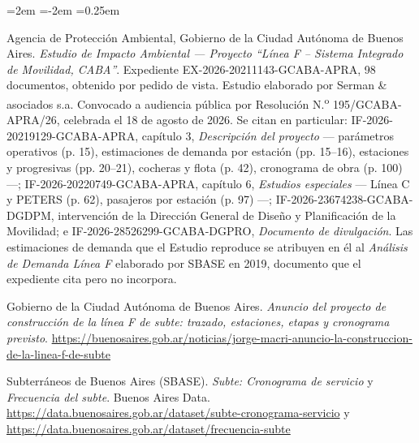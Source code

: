 \documentclass{article}
\begin{document}
\begin{list}{}{\leftmargin=2em \itemindent=-2em \itemsep=0.25em}
\item[] [13] Agencia de Protección Ambiental, Gobierno de la Ciudad Autónoma de Buenos Aires.
\textit{Estudio de Impacto Ambiental --- Proyecto ``Línea F -- Sistema Integrado de Movilidad, CABA''}.
Expediente EX-2026-20211143-GCABA-APRA, 98 documentos, obtenido por pedido de vista. Estudio elaborado por
Serman \& asociados s.a. Convocado a audiencia pública por Resolución N.\textsuperscript{o}
195/GCABA-APRA/26, celebrada el 18 de agosto de 2026. Se citan en particular: IF-2026-20219129-GCABA-APRA,
capítulo 3, \textit{Descripción del proyecto} --- parámetros operativos (p. 15), estimaciones de demanda por
estación (pp. 15--16), estaciones y progresivas (pp. 20--21), cocheras y flota (p. 42), cronograma de obra
(p. 100) ---; IF-2026-20220749-GCABA-APRA, capítulo 6, \textit{Estudios especiales} --- Línea C y PETERS
(p. 62), pasajeros por estación (p. 97) ---; IF-2026-23674238-GCABA-DGDPM, intervención de la Dirección
General de Diseño y Planificación de la Movilidad; e IF-2026-28526299-GCABA-DGPRO, \textit{Documento de
divulgación}. Las estimaciones de demanda que el Estudio reproduce se atribuyen en él al
\textit{Análisis de Demanda Línea F} elaborado por SBASE en 2019, documento que el expediente cita pero no
incorpora.

\item[] [14] Gobierno de la Ciudad Autónoma de Buenos Aires. \textit{Anuncio del proyecto de construcción de
la línea F de subte: trazado, estaciones, etapas y cronograma previsto}.
\url{https://buenosaires.gob.ar/noticias/jorge-macri-anuncio-la-construccion-de-la-linea-f-de-subte}

\item[] [15] Subterráneos de Buenos Aires (SBASE). \textit{Subte: Cronograma de servicio} y
\textit{Frecuencia del subte}. Buenos Aires Data.
\url{https://data.buenosaires.gob.ar/dataset/subte-cronograma-servicio} y
\url{https://data.buenosaires.gob.ar/dataset/frecuencia-subte}

\end{list}
\end{document}
